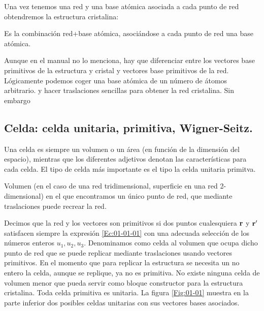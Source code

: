 Una vez tenemos una red y una base atómica asociada a cada punto de red obtendremos la estructura cristalina:

\begin{definition}
    Es la combinación red+base atómica, asociándose a cada punto de red una base atómica. 
\end{definition}

Aunque en el manual \cite{Fisica_del_Estado_Solido} no lo menciona, hay que diferenciar entre los vectores base primitivos de la estructura y cristal y vectores base primitivos de la red. Lógicamente podemos coger una base atómica de un número de átomos arbitrario. y hacer traslaciones sencillas para obtener la red cristalina. Sin embargo 

\subsection{Celda: celda unitaria, primitiva, Wigner-Seitz.}

Una celda es siempre un volumen o un área (en función de la dimensión del espacio), mientras que los diferentes adjetivos denotan las características para cada celda. El tipo de celda más importante es el tipo la celda unitaria primitva.

\begin{definition}
	Volumen (en el caso de una red tridimensional, superficie en una red 2-dimensional) en el que encontramos un único punto de red, que mediante traslaciones puede recrear la red. 
\end{definition}

\begin{definition}
    Decimos que la red y los vectores son primitivos si dos puntos cualesquiera $\mathbf{r}$ y $\mathbf{r}'$ satisfacen siempre la expresión \ref{Ec:01-01-01} con una adecuada selección de los números enteros $u_1,u_2,u_3$. Denominamos como celda al volumen que ocupa dicho punto de red que se puede replicar mediante traslaciones usando vectores primitivos. En el momento que para replicar la estructura se necesita un no entero la celda, aunque se replique, ya no es primitiva. No existe ninguna celda de volumen menor que pueda servir como bloque constructor para la estructura cristalina. Toda celda primitiva es unitaria. La figura \ref{Fig:01-01} muestra en la parte inferior dos posibles celdas unitarias con sus vectores bases asociados.   
\end{definition}

